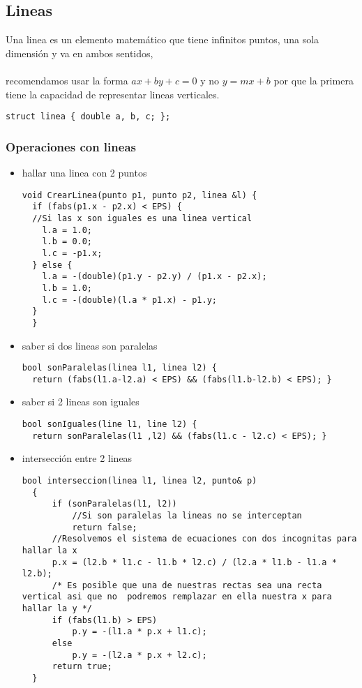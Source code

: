 \subsection{Lineas}
Una linea es un elemento matemático que tiene infinitos puntos, una sola dimensión y va en ambos sentidos,
\\
\\recomendamos usar
la forma $ax+by+c=0$ y no $y=mx+b$ por que la primera tiene la capacidad de representar lineas verticales.
\begin{lstlisting}[style=C]
struct linea { double a, b, c; };
\end{lstlisting}
\subsubsection{Operaciones con lineas}
\begin{itemize}
  \item hallar una linea con 2 puntos
  \\
  \begin{lstlisting}[style=C]
  void CrearLinea(punto p1, punto p2, linea &l) {
  if (fabs(p1.x - p2.x) < EPS) {
  //Si las x son iguales es una linea vertical
    l.a = 1.0;
    l.b = 0.0;
    l.c = -p1.x;
  } else {
    l.a = -(double)(p1.y - p2.y) / (p1.x - p2.x);
    l.b = 1.0;
    l.c = -(double)(l.a * p1.x) - p1.y;
  }
  }
  \end{lstlisting}
  \item saber si dos lineas son paralelas
  \\
  \begin{lstlisting}[style=C]
  bool sonParalelas(linea l1, linea l2) {
  return (fabs(l1.a-l2.a) < EPS) && (fabs(l1.b-l2.b) < EPS); }
  \end{lstlisting}
  \item saber si 2 lineas son iguales
  \\
  \begin{lstlisting}[style=C]
  bool sonIguales(line l1, line l2) {
  return sonParalelas(l1 ,l2) && (fabs(l1.c - l2.c) < EPS); }
  \end{lstlisting}
  \item intersección entre 2 lineas
  \\
  \begin{lstlisting}[style=C]
  bool interseccion(linea l1, linea l2, punto& p)
  {
      if (sonParalelas(l1, l2))
          //Si son paralelas la lineas no se interceptan
          return false;
      //Resolvemos el sistema de ecuaciones con dos incognitas para hallar la x
      p.x = (l2.b * l1.c - l1.b * l2.c) / (l2.a * l1.b - l1.a * l2.b);
      /* Es posible que una de nuestras rectas sea una recta vertical asi que no  podremos remplazar en ella nuestra x para hallar la y */
      if (fabs(l1.b) > EPS)
          p.y = -(l1.a * p.x + l1.c);
      else
          p.y = -(l2.a * p.x + l2.c);
      return true;
  }
  \end{lstlisting}
\end{itemize}
